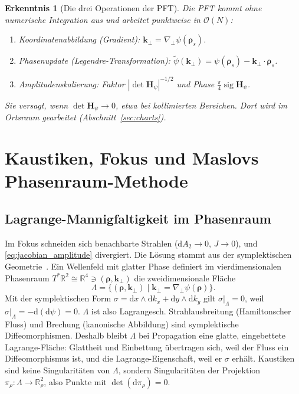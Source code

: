 \documentclass[11pt,a4paper]{scrartcl}
\theoremstyle{insightstyle}
\newtheorem{erkenntnis}{Erkenntnis}
\newcommand{\dd}{\mathrm{d}}
\newcommand{\R}{\mathbb{R}}
\newcommand{\grad}{\nabla_{\!\perp}}
\newcommand{\Hess}{\bm{H}}
\newcommand{\rh}{\bm{\rho}}
\newcommand{\kp}{\bm{k}_\perp}
\DeclareMathOperator{\sig}{sig}
\begin{document}
\begin{erkenntnis}[Die drei Operationen der PFT]
Die PFT kommt ohne numerische Integration aus und arbeitet punktweise in $\mathcal O(N)$:
\begin{enumerate}
    \item Koordinatenabbildung (Gradient): $\kp=\grad\psi(\rh_s)$.
    \item Phasenupdate (Legendre-Transformation): $\tilde\psi(\kp)=\psi(\rh_s)-\kp\cdot\rh_s$.
    \item Amplitudenskalierung: Faktor $|\det\Hess_\psi|^{-1/2}$ und Phase $\frac\pi4\sig\Hess_\psi$.
\end{enumerate}
Sie versagt, wenn $\det\Hess_\psi\to0$, etwa bei kollimierten Bereichen. Dort wird im Ortsraum gearbeitet (Abschnitt~\ref{sec:charts}).
\end{erkenntnis}

\section{Kaustiken, Fokus und Maslovs Phasenraum-Methode}\label{sec:caustics}

\subsection{Lagrange-Mannigfaltigkeit im Phasenraum}
Im Fokus schneiden sich benachbarte Strahlen ($\dd A_2\to0$, $J\to0$), und \eqref{eq:jacobian_amplitude} divergiert. Die Lösung stammt aus der symplektischen Geometrie~\cite{maslov1965,maslov1981,arnold1967}. Ein Wellenfeld mit glatter Phase definiert im vierdimensionalen Phasenraum $T^*\R^2\cong\R^4\ni(\rh,\kp)$ die zweidimensionale Fläche
\begin{equation}
    \Lambda = \big\{(\rh,\kp)\;\big|\;\kp=\grad\psi(\rh)\big\}.
\end{equation}
Mit der symplektischen Form $\sigma=\dd x\wedge\dd k_x+\dd y\wedge\dd k_y$ gilt $\sigma|_\Lambda=0$, weil $\sigma|_\Lambda=-\dd(\dd\psi)=0$. $\Lambda$ ist also Lagrangesch. Strahlausbreitung (Hamiltonscher Fluss) und Brechung (kanonische Abbildung) sind symplektische Diffeomorphismen. Deshalb bleibt $\Lambda$ bei Propagation eine glatte, eingebettete Lagrange-Fläche: Glattheit und Einbettung übertragen sich, weil der Fluss ein Diffeomorphismus ist, und die Lagrange-Eigenschaft, weil er $\sigma$ erhält. Kaustiken sind keine Singularitäten von $\Lambda$, sondern Singularitäten der Projektion $\pi_\rho:\Lambda\to\R^2_\rho$, also Punkte mit $\det(\dd\pi_\rho)=0$.
\end{document}

